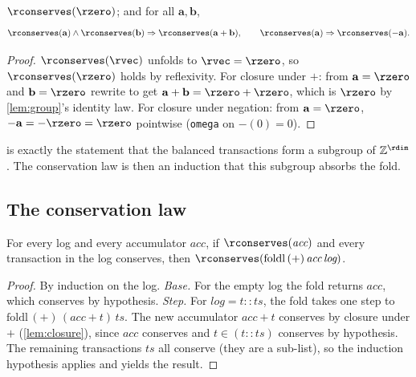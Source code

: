 \begin{lemma}
\label{lem:closure}
$\rconserves(\rzero)$; and for all $\mathbf{a},\mathbf{b}$,
\[
  \rconserves(\mathbf{a}) \wedge \rconserves(\mathbf{b})
  \Rightarrow \rconserves(\mathbf{a}+\mathbf{b}),
  \qquad
  \rconserves(\mathbf{a}) \Rightarrow \rconserves(-\mathbf{a}).
\]
\end{lemma}

\begin{proof}
$\rconserves(\rvec)$ unfolds to $\rvec = \rzero$, so $\rconserves(\rzero)$ holds
by reflexivity. For closure under $+$: from $\mathbf{a} = \rzero$ and
$\mathbf{b} = \rzero$ rewrite to get $\mathbf{a}+\mathbf{b} = \rzero + \rzero$,
which is $\rzero$ by \cref{lem:group}'s identity law. For closure under
negation: from $\mathbf{a} = \rzero$, $-\mathbf{a} = -\rzero = \rzero$
pointwise (\texttt{omega} on $-(0)=0$).
\end{proof}

 is exactly the statement that the balanced
transactions form a subgroup of $\mathbb{Z}^{\rdim}$. The conservation law
is then an induction that this subgroup absorbs the fold.

\subsection{The conservation law}

\begin{lemma}
\label{lem:fold}
For every log and every accumulator $\textit{acc}$, if
$\rconserves(\textit{acc})$ and every transaction in the log conserves,
then $\rconserves(\mathrm{foldl}\,(+)\,\textit{acc}\,\textit{log})$.
\end{lemma}

\begin{proof}
By induction on the log.
\emph{Base.} For the empty log the fold returns $\textit{acc}$, which
conserves by hypothesis.
\emph{Step.} For $\textit{log} = t :: ts$, the fold takes one step to
$\mathrm{foldl}\,(+)\,(\textit{acc}+t)\,ts$. The new accumulator
$\textit{acc}+t$ conserves by closure under $+$ (\cref{lem:closure}),
since $\textit{acc}$ conserves and $t \in (t::ts)$ conserves by
hypothesis. The remaining transactions $ts$ all conserve (they are a
sub-list), so the induction hypothesis applies and yields the result.
\end{proof}

